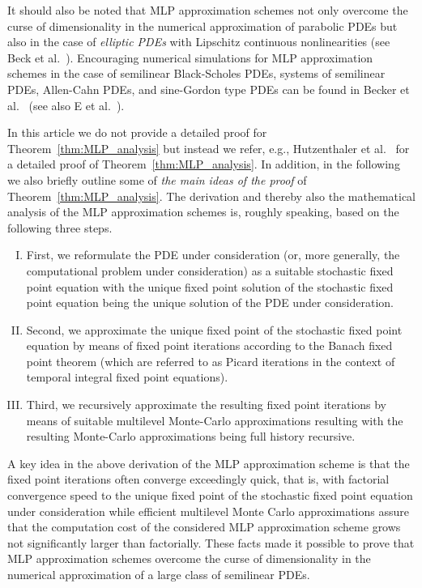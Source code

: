 \documentclass[12pt,AutoFakeBold,AutoFakeSlant]{article}
\theoremstyle{definition}
\begin{document}
	It should also be noted that MLP approximation 
	schemes not only overcome the curse of dimensionality 
	in the numerical approximation of parabolic PDEs but also in the case of \emph{elliptic PDEs} with Lipschitz 
	continuous nonlinearities (see Beck et al.~\cite{beck2020arxiv2003}). 
	Encouraging numerical simulations for MLP approximation schemes 
	in the case of semilinear Black-Scholes PDEs, systems of semilinear PDEs, Allen-Cahn PDEs, 
	and sine-Gordon type PDEs can be found in Becker et al.~\cite{becker2020arxiv2005} (see also E et al.~\cite{E2019multilevel}).


	In this article we do not provide a detailed proof for Theorem~\ref{thm:MLP_analysis} 
	but instead we refer, e.g., Hutzenthaler et al.~\cite{Hutzenthaleretal2018arXiv,hutzenthaler2020lipschitz}
	for a detailed proof of Theorem~\ref{thm:MLP_analysis}. 
	In addition, in the following we also briefly outline 
	some of \emph{the main ideas of the proof} of Theorem~\ref{thm:MLP_analysis}. 
	The derivation and thereby also the mathematical analysis of the MLP approximation schemes 
	is, roughly speaking, based on the following three steps. 
	\begin{enumerate}[(I)]
	\item 
	First, we reformulate the PDE under consideration (or, more generally, the computational problem under consideration) 
	as a suitable stochastic fixed point equation with the unique fixed point solution of 
	the stochastic fixed point equation being the unique solution of the PDE under consideration. 
	\item 
	Second, we approximate the unique fixed point of the stochastic fixed point equation by means 
	of fixed point iterations according to the Banach fixed point theorem (which are referred to as 
	Picard iterations in the context of temporal integral fixed point equations). 
	\item 
	Third, we recursively approximate the resulting fixed point iterations by means of 
	suitable multilevel Monte-Carlo approximations resulting with the resulting Monte-Carlo approximations 
	being full history recursive. 
	\end{enumerate}
	A key idea in the above derivation of the MLP approximation scheme is that the fixed point iterations often converge 
	exceedingly quick, that is, with factorial convergence speed to the unique fixed point of the stochastic fixed 
	point equation under consideration while efficient multilevel Monte Carlo approximations assure that the 
	computation cost of the considered MLP approximation scheme grows 
	not significantly larger than factorially. 
	These facts made it possible to prove that MLP approximation schemes overcome the curse of dimensionality 
	in the numerical approximation of a large class of semilinear PDEs. 
\end{document}
